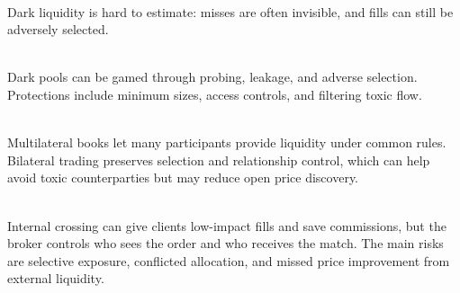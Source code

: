 \begin{caveat} \\
Dark liquidity is hard to estimate: misses are often invisible, and fills can still be adversely selected.
\end{caveat}

\begin{caveat} \\
Dark pools can be gamed through probing, leakage, and adverse selection. Protections include minimum sizes, access controls, and filtering toxic flow.
\end{caveat}

\begin{taxonomy} \\
Multilateral books let many participants provide liquidity under common rules. Bilateral trading preserves selection and relationship control, which can help avoid toxic counterparties but may reduce open price discovery.
\end{taxonomy}

\begin{caveat} \\
Internal crossing can give clients low-impact fills and save commissions, but the broker controls who sees the order and who receives the match. The main risks are selective exposure, conflicted allocation, and missed price improvement from external liquidity.
\end{caveat}
